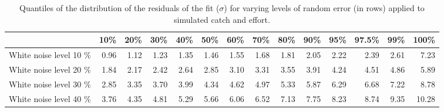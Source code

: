 \begin{sidewaystable}[ht]
\centering
\begin{tabular}{rrrrrrrrrrrrrr}
  \hline
 & 10\% & 20\% & 30\% & 40\% & 50\% & 60\% & 70\% & 80\% & 90\% & 95\% & 97.5\% & 99\% & 100\% \\ 
  \hline
White noise level  10 \% & 0.96 & 1.12 & 1.23 & 1.35 & 1.46 & 1.55 & 1.68 & 1.81 & 2.05 & 2.22 & 2.39 & 2.61 & 7.23 \\ 
  White noise level  20 \% & 1.84 & 2.17 & 2.42 & 2.64 & 2.85 & 3.10 & 3.31 & 3.55 & 3.91 & 4.24 & 4.51 & 4.86 & 5.89 \\ 
  White noise level  30 \% & 2.85 & 3.35 & 3.70 & 3.99 & 4.34 & 4.62 & 4.97 & 5.33 & 5.87 & 6.29 & 6.68 & 7.22 & 8.78 \\ 
  White noise level  40 \% & 3.76 & 4.35 & 4.81 & 5.29 & 5.66 & 6.06 & 6.52 & 7.13 & 7.75 & 8.23 & 8.74 & 9.35 & 10.28 \\ 
   \hline
\end{tabular}
\caption{Quantiles of the distribution of the residuals of the fit ($\sigma$) for varying levels of random error (in rows) applied to simulated catch and effort.} 
\label{tab:SummaryOfDistributionOfSigma}
\end{sidewaystable}
